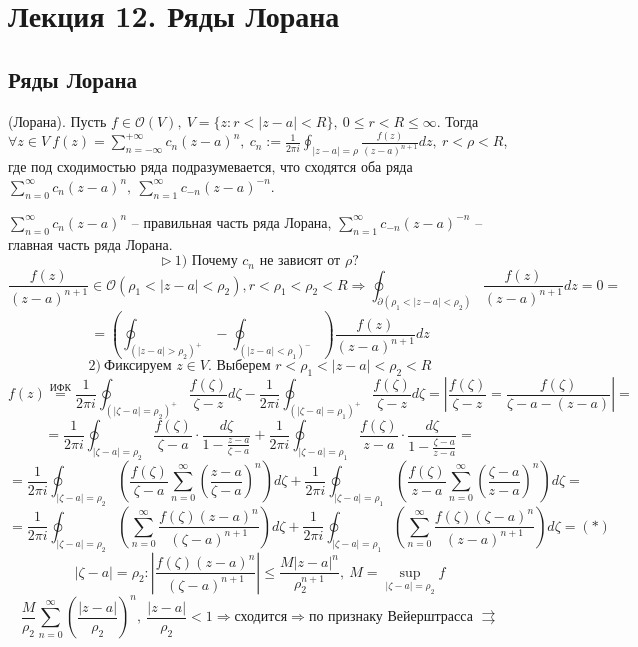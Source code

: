 \section{Лекция 12. Ряды Лорана}
\subsection{Ряды Лорана}
 (Лорана). Пусть $f \in \mathcal{O}(V), \ V = \{z: r < |z-a|< R\}, \ 0 \leq r < R \leq \infty.$ Тогда $\forall z \in V \ f(z) = \sum_{n=-\infty}^{+\infty} c_n (z-a)^n, \ c_n := \frac{1}{2\pi i} \oint_{|z-a|=\rho} \frac{f(z)}{(z-a)^{n+1}}dz, \ r<\rho<R$, где под сходимостью ряда подразумевается, что сходятся оба ряда  $\sum_{n=0}^\infty c_n(z-a)^n, \ \sum_{n=1}^{\infty}c_{-n} (z-a)^{-n}$.
 
$\sum_{n=0}^\infty c_n(z-a)^n$ -- правильная часть ряда Лорана, $\sum_{n=1}^{\infty}c_{-n} (z-a)^{-n}$ -- главная часть ряда Лорана.
\[\triangleright \ 1) \text{ Почему $c_n$ не зависят от $\rho$?}\]
\[\frac{f(z)}{(z-a)^{n+1}} \in \mathcal{O}(\rho_1 < |z-a|<\rho_2), r<\rho_1<\rho_2<R \Rightarrow \oint_{\partial(\rho_1<|z-a|<\rho_2)} \frac{f(z)}{(z-a)^{n+1}}dz = 0 =\]
\[=\left(\oint_{(|z-a|>\rho_2)^+} - \oint_{(|z-a|<\rho_1)^-}\right)\frac{f(z)}{(z-a)^{n+1}}dz\]
\[2) \ \text{Фиксируем } z \in V. \text{ Выберем } r<\rho_1< |z-a|<\rho_2<R\]
\[f(z) \overset{\text{ИФК}}{=} \frac{1}{2\pi i}\oint_{(|\zeta-a|=\rho_2)^+} \frac{f(\zeta)}{\zeta-z}d\zeta - \frac{1}{2\pi i} \oint_{(|\zeta-a|=\rho_1)^+} \frac{f(\zeta)}{\zeta-z}d\zeta = \left|\frac{f(\zeta)}{\zeta-z} =\frac{f(\zeta)}{\zeta-a-(z-a)}\right|=\]
\[=\frac{1}{2\pi i} \oint_{|\zeta-a|=\rho_2} \frac{f(\zeta)}{\zeta -a}\cdot \frac{d\zeta}{1-\frac{z-a}{\zeta-a}} + \frac{1}{2\pi i} \oint_{|\zeta-a|=\rho_1} \frac{f(\zeta)}{z-a} \cdot \frac{d\zeta}{1-\frac{\zeta - a}{z-a}} =\] 
\[=\frac{1}{2\pi i} \oint_{|\zeta-a|=\rho_2}\left(\frac{f(\zeta)}{\zeta-a}\sum_{n=0}^\infty \left(\frac{z-a}{\zeta-a}\right)^n \right)d\zeta +\frac{1}{2\pi i}\oint_{|\zeta-a|=\rho_1}\left( \frac{f(\zeta)}{z-a} \sum_{n=0}^\infty \left(\frac{\zeta-a}{z-a}\right)^n \right)d\zeta =\]
\[=\frac{1}{2\pi i} \oint_{|\zeta-a|=\rho_2} \left(\sum_{n=0}^\infty \frac{f(\zeta)(z-a)^n}{(\zeta-a)^{n+1}}\right)d\zeta+\frac{1}{2\pi i}\oint_{|\zeta-a|=\rho_1} \left(\sum_{n=0}^\infty \frac{f(\zeta)(\zeta-a)^n}{(z-a)^{n+1}}\right)d\zeta = (*)\]
\[|\zeta-a|=\rho_2:\left|\frac{f(\zeta )(z -a)^n}{(\zeta-a)^{n+1}}\right| \leq \frac{M |z-a|^n}{\rho_2^{n+1}}, \ M = \sup_{|\zeta-a|=\rho_2}f\]
\[\frac{M}{\rho_2}\sum_{n=0}^\infty \left(\frac{|z-a|}{\rho_2}\right)^n, \ \frac{|z-a|}{\rho_2} < 1 \Rightarrow \text{сходится} \Rightarrow \text{по признаку Вейерштрасса } \rightrightarrows\]

